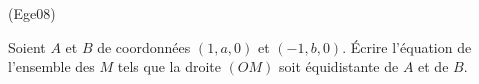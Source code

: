 \begin{tiny}(Ege08)\end{tiny}
Soient $A$ et $B$ de coordonn{\'e}es $(1,a,0)$ et $(-1,b,0)$. {\'E}crire l'{\'e}quation de l'ensemble des $M$ tels que la droite $(OM)$ soit {\'e}quidistante de $A$ et de $B$.